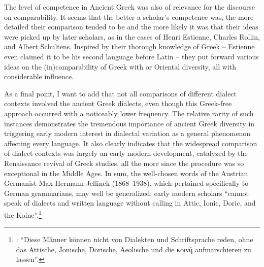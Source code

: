 The level of competence in Ancient Greek was also of relevance for the discourse on comparability. It seems that the better a scholar’s competence was, the more detailed their comparison tended to be and the more likely it was that their ideas were picked up by later scholars, as in the cases of Henri Estienne, Charles Rollin, and Albert Schultens. Inspired by their thorough knowledge of Greek – Estienne even claimed it to be his second language before Latin – they put forward various ideas on the (in)comparability of Greek with  or Oriental diversity, all with considerable influence.

As a final point, I want to add that not all comparisons of different dialect contexts involved the ancient Greek dialects, even though this Greek-free approach occurred with a noticeably lower frequency. The relative rarity of such instances demonstrates the tremendous importance of ancient Greek diversity in triggering early modern interest in dialectal variation as a general phenomenon affecting every language. It also clearly indicates that the widespread comparison of dialect contexts was largely an early modern development, catalyzed by the Renaissance revival of Greek studies, all the more since the procedure was so exceptional in the Middle Ages. In sum, the well-chosen words of the Austrian Germanist Max Hermann Jellinek (1868–1938), which pertained specifically to German grammarians, may well be generalized: early modern scholars “cannot speak of dialects and written language without calling in Attic, Ionic, Doric, and the Koine”.\footnote{\citet[21]{Jellinek1913}: “Diese Männer können nicht von Dialekten und Schriftsprache reden, ohne das Attische, Jonische, Dorische, Aeolische und die κoινή aufmarschieren zu lassen”.}

